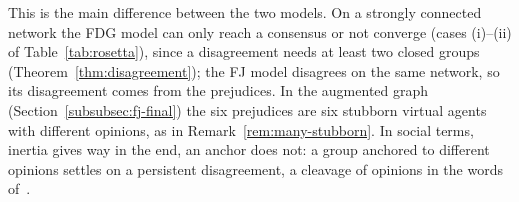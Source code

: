 This is the main difference between the two models. On a strongly connected network the
FDG model can only reach a consensus or not converge (cases (i)--(ii) of
Table~\ref{tab:rosetta}), since a disagreement needs at least two closed groups
(Theorem~\ref{thm:disagreement}); the FJ model disagrees on the same network, so its
disagreement comes from the prejudices. In the augmented graph
(Section~\ref{subsubsec:fj-final}) the six prejudices are six stubborn
virtual agents with different opinions, as in Remark~\ref{rem:many-stubborn}. In social
terms, inertia gives way in the end, an anchor does not: a group anchored to different
opinions settles on a persistent disagreement, a cleavage of opinions in the words
of~\cite{proskurnikov2017tutorial}.
%
